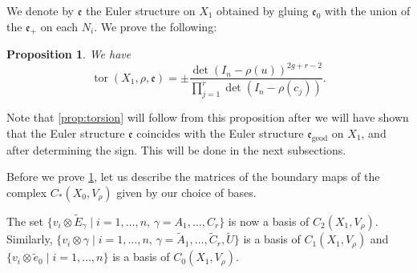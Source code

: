 \documentclass[10pt]{amsart}
\theoremstyle{plain}
\newtheorem{prop}[thm]{Proposition}
\theoremstyle{definition}
\theoremstyle{remark}
\newcommand{\geod}{\mathrm{geod}}
\numberwithin{equation}{section}
\DeclareMathOperator{\tor}{tor}
\begin{document}
We denote by $\mathfrak e$ the Euler structure on $X_1$ obtained by gluing $\mathfrak e_0$ with the union of the $\mathfrak e_+$ on each $N_i$. We prove the following:
\begin{prop}
\label{prop:torscomb}
We have\vspace*{-3pt}
\[
\tor(X_1, \rho, \mathfrak e) = \pm \frac{\det(I_n-\rho(u))^{2g+r-2}}{\prod_{j=1}^r \det(I_n-\rho(c_j))}.
\]
\end{prop}

Note that \cref{prop:torsion} will follow from this proposition after we will have shown that the Euler structure $\mathfrak e$ coincides with the Euler structure $\mathfrak e_\geod$ on $X_1$, and after determining the sign. This will be done in the next subsections.

Before we prove \cref{prop:torscomb}, let us describe the matrices of the boundary maps of the complex $C_*(X_0, V_\rho)$ given by our choice of bases.

The set $\{ v_i \otimes \widetilde E_\gamma \mid i = 1, \ldots, n, \, \gamma = A_1, \ldots, C_r \}$ is now a basis of $C_2(X_1, V_\rho)$. Similarly, $\{v_i \otimes \gamma \mid i = 1, \ldots, n, \, \gamma = \widetilde A_1, \ldots, \widetilde C_r, \widetilde U \}$ is a basis of $C_1(X_1, V_\rho)$ and $\{v_i \otimes \widetilde e_0 \mid i= 1, \ldots, n\}$ is a basis of $C_0(X_1, V_\rho)$.
\end{document}
